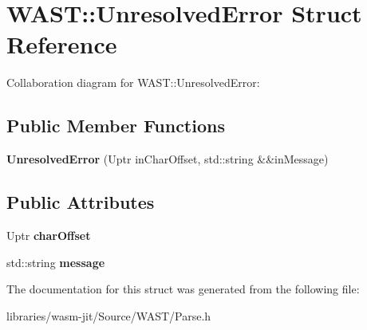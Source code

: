 \hypertarget{struct_w_a_s_t_1_1_unresolved_error}{}\section{W\+A\+ST\+:\+:Unresolved\+Error Struct Reference}
\label{struct_w_a_s_t_1_1_unresolved_error}


Collaboration diagram for W\+A\+ST\+:\+:Unresolved\+Error\+:
\subsection*{Public Member Functions}
\begin{DoxyCompactItemize}
\item 
\mbox{\label{struct_w_a_s_t_1_1_unresolved_error_afc2fce61d49a7aaa762ec6e1c83a35a8}} 
{\bfseries Unresolved\+Error} (Uptr in\+Char\+Offset, std\+::string \&\&in\+Message)
\end{DoxyCompactItemize}
\subsection*{Public Attributes}
\begin{DoxyCompactItemize}
\item 
\mbox{\label{struct_w_a_s_t_1_1_unresolved_error_a7f0172fa4a6d097e49e2a3f8a5212ad4}} 
Uptr {\bfseries char\+Offset}
\item 
\mbox{\label{struct_w_a_s_t_1_1_unresolved_error_adc9f7f8c092119a065dd2a590830d41b}} 
std\+::string {\bfseries message}
\end{DoxyCompactItemize}


The documentation for this struct was generated from the following file\+:\begin{DoxyCompactItemize}
\item 
libraries/wasm-\/jit/\+Source/\+W\+A\+S\+T/Parse.\+h\end{DoxyCompactItemize}

